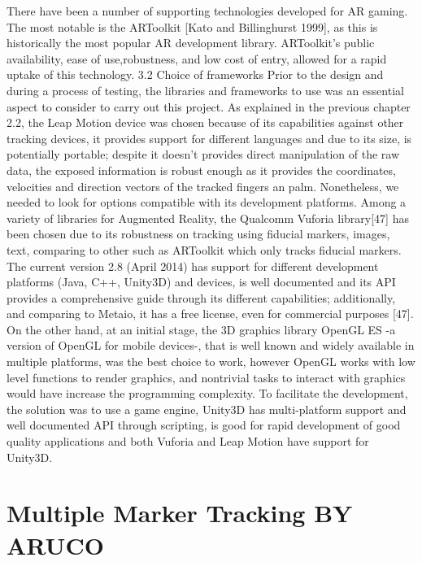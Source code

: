 There have been a number of supporting technologies developed for AR gaming. The most notable is the ARToolkit [Kato and Billinghurst 1999], as this is historically the most popular AR development library. ARToolkit’s public availability, ease of use,robustness, and low cost of entry, allowed for a rapid uptake of this technology.
3.2 Choice of frameworks Prior to the design and during a process of testing, the libraries and frameworks to use was an essential aspect to consider to carry out this project. As explained in the previous chapter 2.2, the Leap Motion device was chosen because of its capabilities against other tracking devices, it provides support for different languages and due to its size, is potentially portable; despite it doesn’t provides direct manipulation of the raw data, the exposed information is robust enough as it provides the coordinates, velocities and direction vectors of the tracked fingers an palm. Nonetheless, we needed to look for options compatible with its development platforms. Among a variety of libraries for Augmented Reality, the Qualcomm Vuforia library[47] has been chosen due to its robustness on tracking using fiducial markers, images, text, comparing to other such as ARToolkit which only tracks fiducial markers. The current version 2.8 (April 2014) has support for different development platforms (Java, C++, Unity3D) and devices, is well documented and its API provides a comprehensive guide through its different capabilities; additionally, and comparing to Metaio, it has a free license, even for commercial purposes [47]. On the other hand, at an initial stage, the 3D graphics library OpenGL ES -a version of OpenGL for mobile devices-, that is well known and widely available in multiple platforms, was the best choice to work, however OpenGL works with low level functions to render graphics, and nontrivial tasks to interact with graphics would have increase the programming complexity. To facilitate the development, the solution was to use a game engine, Unity3D has multi-platform support and well documented API through scripting, is good for rapid development of good quality applications and both Vuforia and Leap Motion have support for Unity3D.


\section{Multiple Marker Tracking BY ARUCO}




